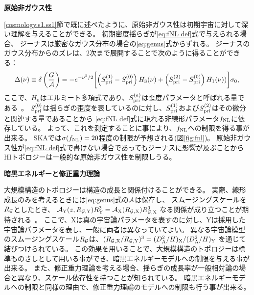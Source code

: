 \begin{description}
\item {\bf 原始非ガウス性　}

\ref{cosmology.s1.ss1}節で既に述べたように、原始非ガウス性は初期宇宙に対して深い理解を与えることができる。
初期密度揺らぎが\eqref{eq:fNL def}式で与えられる場合、
ジーナスは厳密なガウス分布の場合の\eqref{eq:genus}式からずれる。
ジーナスのガウス分布からのズレは、$2$次まで展開することで次のように得ることができる：
\begin{equation}
\Delta(\nu)\equiv \delta\left (\frac{G}{\cal A}\right) =-e^{-\nu^{2}/2}\biggl[\left( S_{\rm pri}^{(1)}-S_{\rm pri}^{(0)}\right) H_{3}(\nu )+\left( S_{\rm pri}^{(2)}-S_{\rm pri}^{(0)}\right) H_{1}(\nu ))\biggr]\sigma_{0},
\end{equation}
ここで、$H_n$はエルミート多項式であり、$S_{\rm pri}^{(a)}$は歪度パラメータと呼ばれる量である~\citep{2006ApJ...653...11H}。
$S^{(0)}_{\rm pri}$は揺らぎの歪度を表しているのに対し、$S^{(1)}_{\rm pri}$および$S^{(2)}_{\rm pri}$はその微分と関連する量であることから
\eqref{eq:fNL def}式に現れる非線形パラメータ$f_{\rm NL}$に依存している。
よって、これを測定することに事により、$f_{{\rm NL}}$への制限を得る事が出来る。
SKAでは$\sigma(f_{\rm NL})=20$程度の制限が予想される(図\ref{fig:fnl})。
原始非ガウス性が\eqref{eq:fNL def}式で書けない場合であってもジーナスに影響が及ぶことから
HIトポロジーは一般的な原始非ガウス性を制限しうる。

\item {\bf 暗黒エネルギーと修正重力理論　}

大規模構造のトポロジーは構造の成長と関係付けることができる。
実際、線形成長のみを考えるときには\eqref{eq:genus}式の${\cal A}$は保存し、
スムージングスケールを$R_{\cal G}$としたとき、
${\cal A}_{\rm Y}(z,R_{{\cal G},{\rm Y}})R_{\rm Y}^{3}={\cal A}_{\rm X}(R_{{\cal G},{\rm X}})R_{{\cal G},{\rm X}}^{3}$
なる関係が成り立つことが期待される~\citep{Park:2009ja}。
ここで、Xは真の宇宙論パラメータを表すのに対し、Yは採用した宇宙論パラメータを表し、一般に両者は異なっていてよい。
異なる宇宙論模型のスムージングスケール$R_{\cal G}$は、$(R_{{\cal G},{\rm X}}/R_{{\cal G},{\rm Y}})^{3}=(D_{\rm A}^{2}/H)_{\rm X}/(D_{\rm A}^{2}/H)_{\rm Y}$
を通じて結びつけられている。
この効果を用いることで、大規模構造のトポロジーは標準ものさしとして用いる事ができ、暗黒エネルギーモデルへの制限を与える事が出来る。
また、修正重力理論を考える場合、揺らぎの成長率が一般相対論の場合と異なり、スケール依存性を持つことが知られている。
暗黒エネルギーモデルへの制限と同様の理由で、修正重力理論のモデルへの制限も行う事が出来る。



\end{description}
